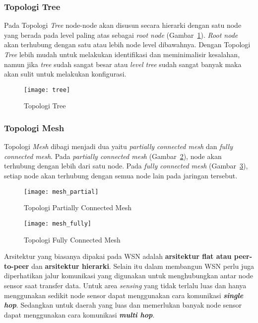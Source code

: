 \subsubsection{Topologi Tree}
Pada Topologi \textit{Tree} node-node akan disusun secara hierarki dengan satu node yang berada pada level paling atas sebagai \textit{root node} (Gambar~\ref{fig:tree}). \textit{Root node} akan terhubung dengan satu atau lebih node level dibawahnya. Dengan Topologi \textit{Tree} lebih mudah untuk melakukan identifikasi dan meminimalisir kesalahan, namun jika \textit{tree} sudah sangat besar atau \textit{level tree} sudah sangat banyak maka akan sulit untuk melakukan konfigurasi.
\begin{figure} [H]
	\centering  
	\texttt{[image: tree]}  
	\caption[Topologi Tree]{Topologi Tree} 
	\label{fig:tree} 
\end{figure} 

\subsubsection{Topologi Mesh}
Topologi \textit{Mesh} dibagi menjadi dua yaitu \textit{partially connected mesh} dan \textit{fully connected mesh}. Pada \textit{partially connected mesh} (Gambar~\ref{fig:mesh_partial}), node akan terhubung dengan lebih dari satu node. Pada \textit{fully connected mesh} (Gambar~\ref{fig:mesh_fully}), setiap node akan terhubung dengan semua node lain pada jaringan tersebut.
\begin{figure} [H]
	\centering  
	\texttt{[image: mesh\_partial]}  
	\caption[Topologi Partially Connected Mesh]{Topologi Partially Connected Mesh} 
	\label{fig:mesh_partial} 
\end{figure} 
\begin{figure} [H]
	\centering  
	\texttt{[image: mesh\_fully]}  
	\caption[Topologi Fully Connected Mesh]{Topologi Fully Connected Mesh} 
	\label{fig:mesh_fully} 
\end{figure} 

Arsitektur yang biasanya dipakai pada WSN adalah \textbf{arsitektur flat atau peer-to-peer} dan \textbf{arsitektur hierarki}. Selain itu dalam membangun WSN perlu juga diperhatikan jalur komunikasi yang digunakan untuk menghubungkan antar node sensor saat transfer data. Untuk area \textit{sensing} yang tidak terlalu luas dan hanya menggunakan sedikit node sensor dapat menggunakan cara komunikasi \textbf{\textit{single hop}}. Sedangkan untuk daerah yang luas dan memerlukan banyak node sensor dapat menggunakan cara komunikasi \textbf{\textit{multi hop}}. 

